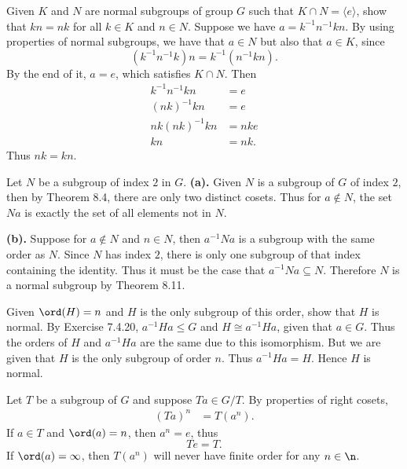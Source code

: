 \begin{problem}[Exercise 9]{
    Given $K$ and $N$ are normal subgroups of group $G$ such that $K \cap N = \langle e \rangle$, show that $kn = nk$ for all $k \in K$ and $n \in N$.
}
    Suppose we have $a = k^{-1}n^{-1}kn$.
    By using properties of normal subgroups, we have that $a \in N$ but also that $a \in K$, since
    \[
        (k^{-1}n^{-1}k)n = k^{-1}(n^{-1}kn).
    \]
    By the end of it, $a = e$, which satisfies $K \cap N$.
    Then
    \begin{align*}
        k^{-1}n^{-1}kn &= e\\
        (nk)^{-1}kn &= e\\
        nk(nk)^{-1}kn &= nke\\
        kn &= nk.
    \end{align*}
    Thus $nk = kn$.
\end{problem}

\begin{problem}[Exercise 10]{
    Let $N$ be a subgroup of index $2$ in $G$.
}
    \textbf{(a).}
    Given $N$ is a subgroup of $G$ of index $2$, then by Theorem 8.4, there are only two distinct cosets.
    Thus for $a \notin N$, the set $Na$ is exactly the set of all elements not in $N$.

    \textbf{(b).}
    Suppose for $a \notin N$ and $n \in N$, then $a^{-1}Na$ is a subgroup with the same order as $N$.
    Since $N$ has index $2$, there is only one subgroup of that index containing the identity.
    Thus it must be the case that $a^{-1}Na \subseteq N$.
    Therefore $N$ is a normal subgroup by Theorem 8.11.
\end{problem}

\begin{problem}[Exercise 11]{
    Given $\ord(H) = n$ and $H$ is the only subgroup of this order, show that $H$ is normal.
}
    By Exercise 7.4.20, $a^{-1}Ha \leq G$ and $H \cong a^{-1}Ha$, given that $a \in G$.
    Thus the orders of $H$ and $a^{-1}Ha$ are the same due to this isomorphism.
    But we are given that $H$ is the only subgroup of order $n$.
    Thus $a^{-1}Ha = H$.
    Hence $H$ is normal.
\end{problem}

\begin{problem}[Exercise 12]{
    Let $T$ be a subgroup of $G$ and suppose $Ta \in G/T$.
}
    By properties of right cosets,
    \begin{align*}
    (Ta)^n &= T(a^n).
    \end{align*}
    If $a \in T$ and $\ord(a) = n$, then $a^n = e$, thus
    \[
        Te = T.
    \]
    If $\ord(a) = \infty$, then $T(a^n)$ will never have finite order for any $n \in \n$.
\end{problem}

